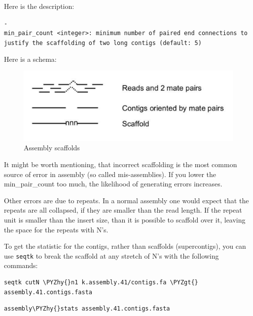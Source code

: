 \documentclass[11pt]{article}
\makeatletter
\def\PYZgt{\char`\>}
\def\PYZhy{\char`\-}
\newcommand{\boxspacing}{\kern\kvtcb@left@rule\kern\kvtcb@boxsep}
\newcommand{\prompt}[4]{
        {\ttfamily\llap{{\color{#2}[#3]:\hspace{3pt}#4}}\vspace{-\baselineskip}}
    }
\makeatother
\begin{document}
Here is the description:

    \texttt{-min\_pair\_count\ \textless{}integer\textgreater{}:\ minimum\ number\ of\ paired\ end\ connections\ to\ justify\ the\ scaffolding\ of\ two\ long\ contigs\ (default:\ 5)}

    Here is a schema:

    \begin{figure}
\centering
\includegraphics{images/schema.png}
\caption{Assembly scaffolds}
\end{figure}

    It might be worth mentioning, that incorrect scaffolding is the most
common source of error in assembly (so called mis-assemblies). If you
lower the min\_pair\_count too much, the likelihood of generating errors
increases.

Other errors are due to repeats. In a normal assembly one would expect
that the repeats are all collapsed, if they are smaller than the read
length. If the repeat unit is smaller than the insert size, than it is
possible to scaffold over it, leaving the space for the repeats with
N's.

To get the statistic for the contigs, rather than scaffolds
(supercontigs), you can use \texttt{seqtk} to break the scaffold at any
stretch of N's with the following commands:

    \begin{tcolorbox}[breakable, size=fbox, boxrule=1pt, pad at break*=1mm,colback=cellbackground, colframe=cellborder]
\prompt{In}{incolor}{ }{\boxspacing}
\begin{Verbatim}[commandchars=\\\{\}]
seqtk cutN \PYZhy{}n1 k.assembly.41/contigs.fa \PYZgt{} assembly.41.contigs.fasta
\end{Verbatim}
\end{tcolorbox}

    \begin{tcolorbox}[breakable, size=fbox, boxrule=1pt, pad at break*=1mm,colback=cellbackground, colframe=cellborder]
\prompt{In}{incolor}{ }{\boxspacing}
\begin{Verbatim}[commandchars=\\\{\}]
assembly\PYZhy{}stats assembly.41.contigs.fasta
\end{Verbatim}
\end{tcolorbox}
\end{document}
